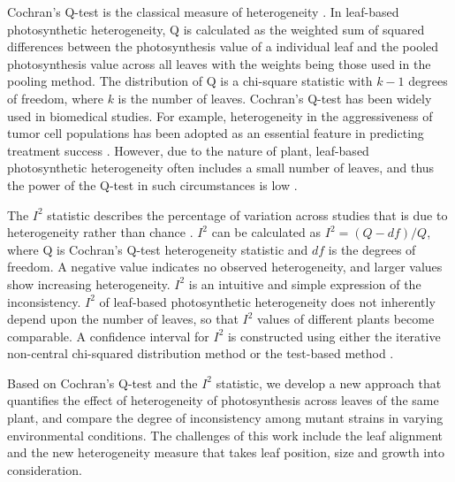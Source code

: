 {Cochran's Q-test is the classical measure of heterogeneity \cite{conover1999Practical}. In leaf-based photosynthetic heterogeneity, Q is calculated as the weighted sum of squared differences between the photosynthesis value of a individual leaf and the pooled photosynthesis value across all leaves with the weights being those used in the pooling method. The distribution of Q is a chi-square statistic with $k-1$ degrees of freedom, where $k$ is the number of leaves. Cochran's Q-test has been widely used in biomedical studies. For example, heterogeneity in the aggressiveness of tumor cell populations has been adopted as an essential feature in predicting treatment success \cite{OSullivan2003}. However, due to the nature of plant, leaf-based photosynthetic heterogeneity often includes a small number of leaves, and thus the power of the Q-test in such circumstances is low \cite{higgins2003measuring, gavaghan2000evaluation}.
%


The $I^2$ statistic describes the percentage of variation across studies that is due to heterogeneity rather than chance \cite{higgins2002quantifying,higgins2003measuring}. $I^2$ can be calculated  as $I^2 = (Q - df)/Q$, where Q is Cochran's Q-test heterogeneity statistic and $df$ is the degrees of freedom. A negative value  indicates no observed heterogeneity, and larger values show increasing heterogeneity. $I^2$ is an intuitive and simple expression of the inconsistency. $I^2$ of leaf-based photosynthetic heterogeneity does not inherently depend upon the number of leaves, so that $I^2$ values of different plants become comparable. A confidence interval for $I^2$ is constructed using either the iterative non-central chi-squared distribution method \cite{hedges2001power} or the test-based method \cite{higgins2002quantifying}.

Based on Cochran's Q-test and the $I^2$ statistic, we develop a new approach that quantifies the effect of heterogeneity of photosynthesis across leaves of the same plant, and compare the degree of inconsistency among mutant strains in varying environmental conditions. The challenges of this work include the leaf alignment and the new heterogeneity measure that takes leaf position, size and growth into consideration.

}
